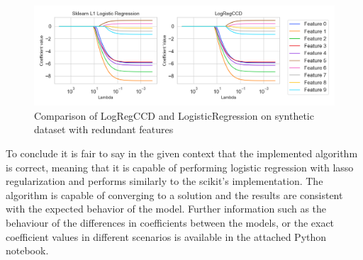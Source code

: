 \documentclass[11pt]{article}
\begin{document}
\begin{figure}[h]
    \centering
  \includegraphics[width=\textwidth]{../results/logistic_regression_l1_logregccd_coefficients_redundant_features.png}
    \caption{Comparison of LogRegCCD and LogisticRegression on synthetic dataset with redundant features}
    \label{fig:comparison-synthetic-dataset-redundant-features}
  \end{figure}


To conclude it is fair to say in the given context that the implemented algorithm is correct, meaning that it is capable of performing logistic regression with lasso regularization and performs similarly to the scikit's implementation. The algorithm is capable of converging to a solution and the results are consistent with the expected behavior of the model. Further information such as the behaviour of the differences in coefficients between the models, or the exact coefficient values in different scenarios is available in the attached Python notebook.


\clearpage 
\listoffigures
\printbibliography
\end{document}
